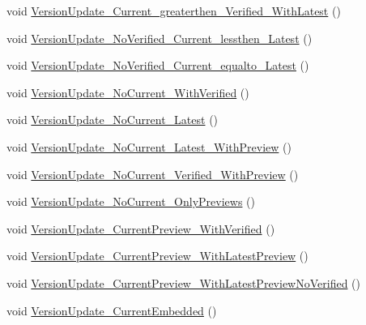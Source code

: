\begin{DoxyCompactItemize}
\item 
void \mbox{\hyperlink{class_unity_editor_1_1_package_manager_1_1_u_i_1_1_tests_1_1_package_tests_a61fe41cf388660def95375971ba9bc6f}{Version\+Update\+\_\+\+Current\+\_\+greaterthen\+\_\+\+Verified\+\_\+\+With\+Latest}} ()
\item 
void \mbox{\hyperlink{class_unity_editor_1_1_package_manager_1_1_u_i_1_1_tests_1_1_package_tests_ad025d2fadcd4f1c351b06cc0910e0328}{Version\+Update\+\_\+\+No\+Verified\+\_\+\+Current\+\_\+lessthen\+\_\+\+Latest}} ()
\item 
void \mbox{\hyperlink{class_unity_editor_1_1_package_manager_1_1_u_i_1_1_tests_1_1_package_tests_aae0f0bbf8b39d03c93a6e61ca493ff1d}{Version\+Update\+\_\+\+No\+Verified\+\_\+\+Current\+\_\+equalto\+\_\+\+Latest}} ()
\item 
void \mbox{\hyperlink{class_unity_editor_1_1_package_manager_1_1_u_i_1_1_tests_1_1_package_tests_a1260da1a54ec0c4bb31a9d843e66b13b}{Version\+Update\+\_\+\+No\+Current\+\_\+\+With\+Verified}} ()
\item 
void \mbox{\hyperlink{class_unity_editor_1_1_package_manager_1_1_u_i_1_1_tests_1_1_package_tests_a6914df73ff53aa9a0c8ede7b1a952620}{Version\+Update\+\_\+\+No\+Current\+\_\+\+Latest}} ()
\item 
void \mbox{\hyperlink{class_unity_editor_1_1_package_manager_1_1_u_i_1_1_tests_1_1_package_tests_a848f7d53ba6a9c9bb0dfab4801688515}{Version\+Update\+\_\+\+No\+Current\+\_\+\+Latest\+\_\+\+With\+Preview}} ()
\item 
void \mbox{\hyperlink{class_unity_editor_1_1_package_manager_1_1_u_i_1_1_tests_1_1_package_tests_a7ba13a28393f72936f75e7150ac5d7e8}{Version\+Update\+\_\+\+No\+Current\+\_\+\+Verified\+\_\+\+With\+Preview}} ()
\item 
void \mbox{\hyperlink{class_unity_editor_1_1_package_manager_1_1_u_i_1_1_tests_1_1_package_tests_aac3367bf8a0b72582da1dca4bed291f7}{Version\+Update\+\_\+\+No\+Current\+\_\+\+Only\+Previews}} ()
\item 
void \mbox{\hyperlink{class_unity_editor_1_1_package_manager_1_1_u_i_1_1_tests_1_1_package_tests_a1b7dd5e5634ea23c6316eada03f878c0}{Version\+Update\+\_\+\+Current\+Preview\+\_\+\+With\+Verified}} ()
\item 
void \mbox{\hyperlink{class_unity_editor_1_1_package_manager_1_1_u_i_1_1_tests_1_1_package_tests_a99c40c9b28c629b0812b3139805a0f39}{Version\+Update\+\_\+\+Current\+Preview\+\_\+\+With\+Latest\+Preview}} ()
\item 
void \mbox{\hyperlink{class_unity_editor_1_1_package_manager_1_1_u_i_1_1_tests_1_1_package_tests_ab098511841095c60f78dc079c00775e0}{Version\+Update\+\_\+\+Current\+Preview\+\_\+\+With\+Latest\+Preview\+No\+Verified}} ()
\item 
void \mbox{\hyperlink{class_unity_editor_1_1_package_manager_1_1_u_i_1_1_tests_1_1_package_tests_a4cee6d471732e7c597ba03fb431d0122}{Version\+Update\+\_\+\+Current\+Embedded}} ()
\end{DoxyCompactItemize}
